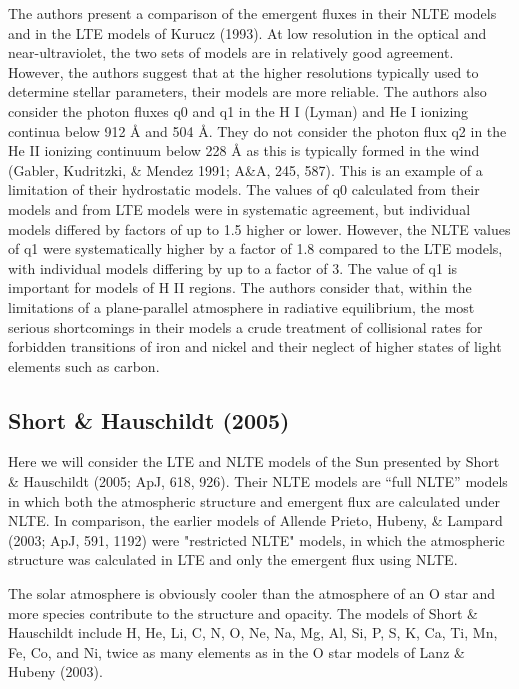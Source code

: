 The authors present a comparison of the emergent fluxes in their NLTE models and in the LTE models of Kurucz (1993). At low resolution in the optical and near-ultraviolet, the two sets of models are in relatively good agreement. However, the authors suggest that at the higher resolutions typically used to determine stellar parameters, their models are more reliable. The authors also consider the photon fluxes q0 and q1 in the H I (Lyman) and He I ionizing continua below 912 Å and 504 Å. They do not consider the photon flux q2 in the He II ionizing continuum below 228 Å as this is typically formed in the wind (Gabler, Kudritzki, \& Mendez 1991; A\&A, 245, 587). This is an example of a limitation of their hydrostatic models. The values of q0 calculated from their models and from LTE models were in systematic agreement, but individual models differed by factors of up to 1.5 higher or lower. However, the NLTE values of q1 were systematically higher by a factor of 1.8 compared to the LTE models, with individual models differing by up to a factor of 3. The value of q1 is important for models of H II regions.
The authors consider that, within the limitations of a plane-parallel atmosphere in radiative equilibrium, the most serious shortcomings in their models a crude treatment of collisional rates for forbidden transitions of iron and nickel and their neglect of higher states of light elements such as carbon.

\newslide

\subsection{Short \& Hauschildt (2005)}

Here we will consider the LTE and NLTE models of the Sun presented by Short \& Hauschildt (2005; ApJ, 618, 926). Their NLTE models are “full NLTE” models in which both the atmospheric structure and emergent flux are calculated under NLTE. In comparison, the earlier models of Allende Prieto, Hubeny, \& Lampard (2003; ApJ, 591, 1192) were "restricted NLTE" models, in which the atmospheric structure was calculated in LTE and only the emergent flux using NLTE.

The solar atmosphere is obviously cooler than the atmosphere of an O star and more species contribute to the structure and opacity. The models of Short \& Hauschildt include H, He, Li, C, N, O, Ne, Na, Mg, Al, Si, P, S, K, Ca, Ti, Mn, Fe, Co, and Ni, twice as many elements as in the O star models of Lanz \& Hubeny (2003).

